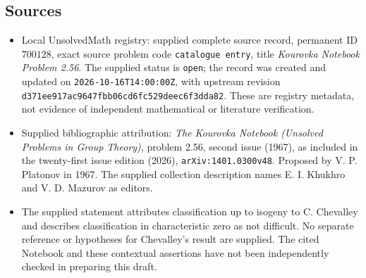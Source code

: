 \documentclass[11pt]{article}
\begin{document}
\subsection{Sources}
\begin{itemize}
\item Local UnsolvedMath registry: supplied complete source record, permanent ID \(700128\), exact source problem code \texttt{catalogue entry}, title \emph{Kourovka Notebook Problem 2.56}. The supplied status is \texttt{open}; the record was created and updated on \texttt{2026-10-16T14:00:00Z}, with upstream revision \texttt{d371ee917ac9647fbb06cd6fc529deec6f3dda82}. These are registry metadata, not evidence of independent mathematical or literature verification.
\item Supplied bibliographic attribution: \emph{The Kourovka Notebook (Unsolved Problems in Group Theory)}, problem 2.56, second issue (1967), as included in the twenty-first issue edition (2026), \texttt{arXiv:1401.0300v48}. Proposed by V. P. Platonov in 1967. The supplied collection description names E. I. Khukhro and V. D. Mazurov as editors.
\item The supplied statement attributes classification up to isogeny to C. Chevalley and describes classification in characteristic zero as not difficult. No separate reference or hypotheses for Chevalley's result are supplied. The cited Notebook and these contextual assertions have not been independently checked in preparing this draft.
\end{itemize}
\end{document}
